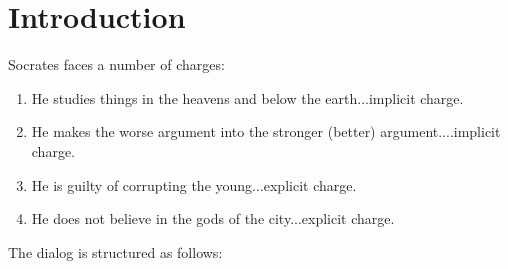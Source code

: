 \documentclass[oneside]{article}
\begin{document}
\thispagestyle{fancy}

\section*{Introduction}

Socrates faces a number of charges:

\begin{enumerate}
\item He studies things in the heavens and below the earth...implicit charge.
\item He makes the worse argument into the stronger (better) argument....implicit charge.
\item He is guilty of corrupting the young...explicit charge.
\item He does not believe in the gods of the city...explicit charge.
\end{enumerate}
The dialog is structured as follows: 
\end{document}
